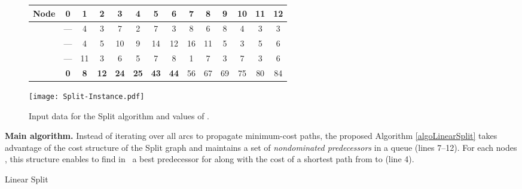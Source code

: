 \documentclass[11pt]{article}
\newcommand{\blue}[1]{{#1}}
\begin{document}
\begin{figure}[H]
\begin{minipage}[t]{.65\linewidth}
\renewcommand{\arraystretch}{1.12}
\setlength{\tabcolsep}{0.12cm}
\scalebox{0.9}
{
\begin{tabular}{|c|ccccccccccccc|}
\hline
\textbf{Node}&\textbf{0}&\textbf{1}&\textbf{2}&\textbf{3}&\textbf{4}&\textbf{5}&\textbf{6}&\textbf{7}&\textbf{8}&\textbf{9}&\textbf{10}&\textbf{11}&\textbf{12}\\
\hline
&---&4&3&7&2&7&3&8&6&8&4&3&3\\
&---&4&5&10&9&14&12&16&11&5&3&5&6\\
&---&11&3&6&5&7&8&1&7&3&7&3&6\\
\hline
\hline
&\textbf{0}&\textbf{8}&\textbf{12}&\textbf{24}&\textbf{25}&\textbf{43}&\textbf{44}& 56 & 67& 69& 75 & 80 & 84 \\
\hline
\end{tabular}
}
\end{minipage}
\begin{minipage}[c]{.35\linewidth}
\vspace*{-0.5cm}
\texttt{[image: Split-Instance.pdf]}
\vspace*{-1cm}
\end{minipage}
\caption{Input data for the Split algorithm and values of .\hspace*{5cm}}
\label{figure-numericalExample}
\end{figure}

\noindent
\textbf{Main algorithm.}  \blue{Instead of iterating over all arcs to propagate minimum-cost paths, the proposed Algorithm \ref{algoLinearSplit} takes advantage of the cost structure of the Split graph and maintains a set of \emph{nondominated predecessors} in a queue  (lines 7--12). For each nodes , this structure enables to find in~ a best predecessor for  along with the cost of a shortest path from  to  (line 4).}

\begin{algorithm}[htb]

 \;
 \;
{ 

  	 \;   \label{linearSplitPropagate}
  	 \;


 	 \If{}
	{
		{
	  		{  \; }
			
		}


   		\While{}
  		{  \; }
	}
}
 \caption{Linear Split} 
\label{algoLinearSplit} 
\end{algorithm}
\end{document}
